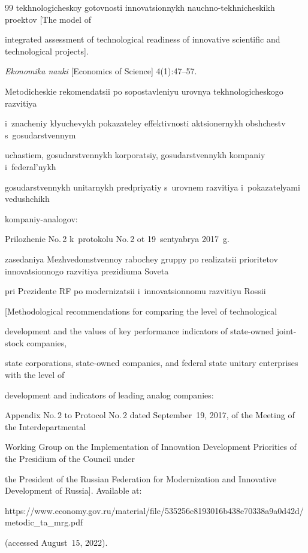 {{\begin{thebibliography}{99}
tekhnologicheskoy gotovnosti innovatsionnykh nauchno-tekhnicheskikh proektov [The model of 

integrated assessment of technological readiness of innovative scientific and technological projects]. 

\textit{Ekonomika nauki} [Economics of Science] 4(1):47--57.


Metodicheskie rekomendatsii po sopostavleniyu urovnya tekhnologicheskogo razvitiya 

i~zna\-che\-niy klyu\-che\-vykh po\-ka\-za\-te\-ley ef\-fek\-tiv\-nosti ak\-tsio\-ner\-nykh obshchestv s~go\-su\-dar\-st\-ven\-nym 

uchastiem, gosudarstvennykh korporatsiy, go\-su\-dar\-st\-ven\-nykh kompaniy i~federal'nykh 

gosudarstvennykh unitarnykh predpriyatiy s~urov\-nem raz\-vi\-tiya i~po\-ka\-za\-te\-lya\-mi vedushchikh 

kompaniy-analogov:

Prilozhenie No.\,2 k~protokolu No.\,2 ot 19~sentyabrya 2017~g. 

zasedaniya Mezhvedomstvennoy rabochey gruppy po rea\-li\-za\-tsii prioritetov innovatsionnogo razvitiya prezidiuma Soveta 

pri Prezidente RF po mo\-der\-ni\-za\-tsii i~in\-no\-va\-tsi\-on\-no\-mu razvitiyu Rossii

[Methodological recommendations for comparing the level of technological 

development and the values of key performance indicators of state-owned joint-stock companies, 

state corporations, state-owned companies, and federal state unitary enterprises with the level of 

development and indicators of leading analog companies:

Appendix No.\,2 to Protocol No.\,2 dated September~19, 2017, of the Meeting of the Interdepartmental 

Working Group on the Implementation of Innovation Development Priorities of the Presidium of the Council under 

the President of the Russian Federation for Modernization and Innovative Development of Russia]. Available at: {\sf 

https://www.economy.gov.ru/material/file/535256\linebreak e8193016b438e70338a9a0d42d/metodic\_ta\_mrg.pdf} 

(accessed August~15, 2022).



\end{thebibliography}

} }



